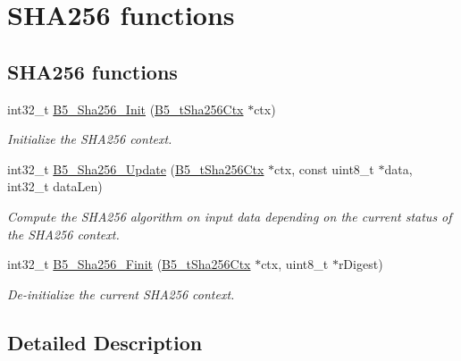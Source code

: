 \hypertarget{group__sha_func}{\section{S\-H\-A256 functions}
\label{group__sha_func}
}
\subsection*{S\-H\-A256 functions}
\begin{DoxyCompactItemize}
\item 
int32\-\_\-t \hyperlink{group__sha_func_gaf3507913b8ba5c90d7aecaa26456082e}{B5\-\_\-\-Sha256\-\_\-\-Init} (\hyperlink{struct_b5__t_sha256_ctx}{B5\-\_\-t\-Sha256\-Ctx} $\ast$ctx)
\begin{DoxyCompactList}\small\item\em Initialize the S\-H\-A256 context. \end{DoxyCompactList}\item 
int32\-\_\-t \hyperlink{group__sha_func_gafedcaa9cc6241df89b13d1533ab7583c}{B5\-\_\-\-Sha256\-\_\-\-Update} (\hyperlink{struct_b5__t_sha256_ctx}{B5\-\_\-t\-Sha256\-Ctx} $\ast$ctx, const uint8\-\_\-t $\ast$data, int32\-\_\-t data\-Len)
\begin{DoxyCompactList}\small\item\em Compute the S\-H\-A256 algorithm on input data depending on the current status of the S\-H\-A256 context. \end{DoxyCompactList}\item 
int32\-\_\-t \hyperlink{group__sha_func_ga481d39b16dccfa2e85d4ad8962c1de3a}{B5\-\_\-\-Sha256\-\_\-\-Finit} (\hyperlink{struct_b5__t_sha256_ctx}{B5\-\_\-t\-Sha256\-Ctx} $\ast$ctx, uint8\-\_\-t $\ast$r\-Digest)
\begin{DoxyCompactList}\small\item\em De-\/initialize the current S\-H\-A256 context. \end{DoxyCompactList}\end{DoxyCompactItemize}


\subsection{Detailed Description}


